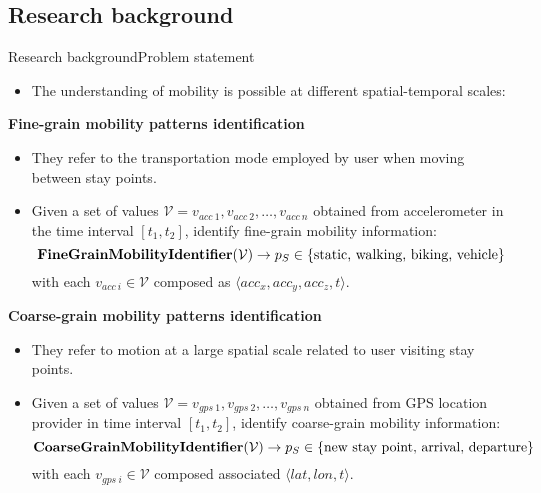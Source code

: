 \subsection{Research background}
\begin{frame}{Research background}{Problem statement}
\small
\vspace{-0.5cm}
\begin{itemize}
  \item The understanding of mobility is possible at different spatial-temporal scales:
\end{itemize}

\begin{exampleblock}{\small \textbf{Fine-grain mobility patterns identification}}
 \begin{itemize}
    \item They refer to the transportation mode employed by user when moving between stay points.
    \item Given a set of values $\mathcal{V} = v_{acc~1},v_{acc~2},\ldots,v_{acc~n}$ obtained from accelerometer in the time interval $[t_1,t_2]$, identify fine-grain mobility information:
\begin{equation*}
  \text{\textbf{FineGrainMobilityIdentifier}}(\mathcal{V}) \rightarrow p_S \in \{ \text{static, walking, biking, vehicle} \}
\end{equation*}
with each $v_{acc~i} \in \mathcal{V}$ composed as $\langle acc_x,acc_y,acc_z,t \rangle$.
  \end{itemize} 
\end{exampleblock}

\begin{exampleblock}{\small \textbf{Coarse-grain mobility patterns identification}}
 \begin{itemize}
   \item They refer to motion at a large spatial scale related to user visiting stay points.
   \item \sloppy Given a set of values $\mathcal{V} = v_{gps~1},v_{gps~2},\ldots,v_{gps~n}$ obtained from GPS location provider in time interval $[t_1,t_2]$, identify coarse-grain mobility information:
\begin{equation*}
    \text{\textbf{CoarseGrainMobilityIdentifier}}(\mathcal{V}) \rightarrow p_S \in \{ \text{new stay point, arrival, departure} \}
\end{equation*}
with each $v_{gps~i} \in \mathcal{V}$ composed associated $\langle lat, lon, t \rangle$.
 \end{itemize}
\end{exampleblock}
\end{frame}


